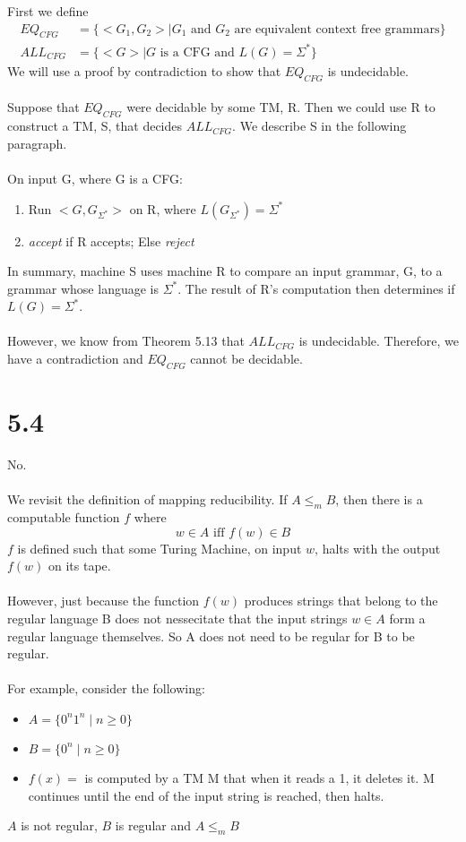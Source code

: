 \documentclass{article}
\begin{document}
First we define
\begin{align*}
    EQ_{CFG} &= \{ <G_1, G_2> | G_1 \textrm{ and } G_2 \textrm{ are equivalent context free grammars} \}\\
    ALL_{CFG} &= \{ <G> | G \textrm{ is a CFG and } L(G) = \Sigma^* \} 
\end{align*} 
We will use a proof by contradiction to show that $EQ_{CFG}$ is undecidable.\\\\
Suppose that $EQ_{CFG}$ were decidable by some TM, R. Then we could use R to construct a TM, S, that decides $ALL_{CFG}$. We describe S in the following paragraph.\\\\
On input G, where G is a CFG:
\begin{enumerate}
    \item Run $<G, G_{\Sigma^*}>$ on R, where $L(G_{\Sigma^*}) = \Sigma^*$
    \item \textit{accept} if R accepts; Else \textit{reject}
\end{enumerate}
In summary, machine S uses machine R to compare an input grammar, G, to a grammar whose language is $\Sigma^*$. The result of R's computation then determines if $L(G) = \Sigma^*$.\\\\
However, we know from Theorem 5.13 that $ALL_{CFG}$ is undecidable. Therefore, we have a contradiction and $EQ_{CFG}$ cannot be decidable.

\section*{5.4}

No.\\\\
We revisit the definition of mapping reducibility. If $A \leq_m B$, then there is a computable function $f$ where
$$w \in A \textrm{  iff   } f(w) \in B$$
$f$ is defined such that some Turing Machine, on input $w$, halts with the output $f(w)$ on its tape. \\\\
However, just because the function $f(w)$ produces strings that belong to the regular language B does not nessecitate that the input strings $w \in A$ form a regular language themselves. So A does not need to be regular for B to be regular.\\\\
For example, consider the following:
\begin{itemize}
\item $A = \{0^n1^n \mid n \geq 0\}$
\item $B = \{0^n \mid n \geq 0\}$
\item $f(x)= $ is computed by a TM M that when it reads a 1, it deletes it. M continues until the end of the input string is reached, then halts.
\end{itemize}
$A$ is not regular, $B$ is regular and $A \leq_m B$
\end{document}
